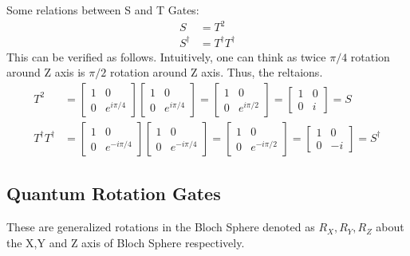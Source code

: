 \documentclass[12pt, oneside]{book}
\theoremstyle{definition}
\theoremstyle{definition}
\theoremstyle{remark}
\begin{document}
Some relations between S and T Gates:
\begin{align*}
    S&=T^2 \\
    S^{\dagger}&=T^{\dagger}T^{\dagger}
\end{align*}
This can be verified as follows. Intuitively, one can think as twice $\pi/4$
rotation around Z axis is $\pi/2$ rotation around Z axis. Thus, the reltaions.
\begin{align*}
    T^2&=\begin{bmatrix}
        1 & 0 \\
        0 & e^{i\pi/4}
    \end{bmatrix}\begin{bmatrix}
        1 & 0 \\
        0 & e^{i\pi/4}
    \end{bmatrix}=\begin{bmatrix}
        1 & 0 \\
        0 & e^{i\pi/2}
    \end{bmatrix}=\begin{bmatrix}
        1 & 0 \\
        0 & i
    \end{bmatrix}=S \\
    T^{\dagger}T^{\dagger}&=\begin{bmatrix}
        1 & 0 \\
        0 & e^{-i\pi/4}
    \end{bmatrix}\begin{bmatrix}
        1 & 0 \\
        0 & e^{-i\pi/4}
    \end{bmatrix}=\begin{bmatrix}
        1 & 0 \\
        0 & e^{-i\pi/2}
    \end{bmatrix}=\begin{bmatrix}
        1 & 0 \\
        0 & -i
    \end{bmatrix}=S^{\dagger}
\end{align*}


\subsection{Quantum Rotation Gates}
These are generalized rotations  in the Bloch Sphere 
denoted as $R_X,R_Y,R_Z$ about the X,Y and Z axis of Bloch Sphere respectively.
\end{document}
